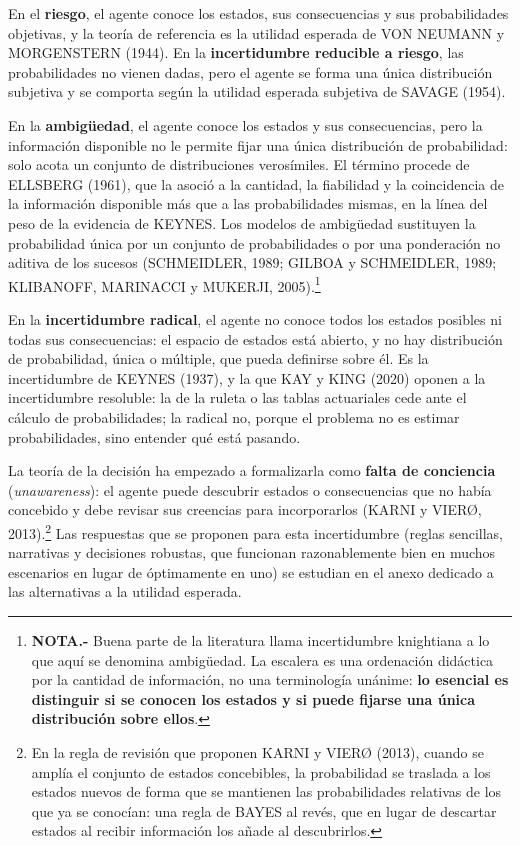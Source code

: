 \documentclass[10pt,a4paper]{article}
\newcounter{anexo}
\begin{document}
En el \textbf{riesgo}, el agente conoce los estados, sus consecuencias y sus probabilidades objetivas, y la teoría de referencia es la utilidad esperada de VON NEUMANN y MORGENSTERN (1944). En la \textbf{incertidumbre reducible a riesgo}, las probabilidades no vienen dadas, pero el agente se forma una única distribución subjetiva y se comporta según la utilidad esperada subjetiva de SAVAGE (1954).

En la \textbf{ambigüedad}, el agente conoce los estados y sus consecuencias, pero la información disponible no le permite fijar una única distribución de probabilidad: solo acota un conjunto de distribuciones verosímiles. El término procede de ELLSBERG (1961), que la asoció a la cantidad, la fiabilidad y la coincidencia de la información disponible más que a las probabilidades mismas, en la línea del peso de la evidencia de KEYNES. Los modelos de ambigüedad sustituyen la probabilidad única por un conjunto de probabilidades o por una ponderación no aditiva de los sucesos (SCHMEIDLER, 1989; GILBOA y SCHMEIDLER, 1989; KLIBANOFF, MARINACCI y MUKERJI, 2005).\footnote{%
    \textbf{NOTA.-} Buena parte de la literatura llama incertidumbre knightiana a lo que aquí se denomina ambigüedad. La escalera es una ordenación didáctica por la cantidad de información, no una terminología unánime: \textbf{lo esencial es distinguir si se conocen los estados y si puede fijarse una única distribución sobre ellos}.
}

En la \textbf{incertidumbre radical}, el agente no conoce todos los estados posibles ni todas sus consecuencias: el espacio de estados está abierto, y no hay distribución de probabilidad, única o múltiple, que pueda definirse sobre él. Es la incertidumbre de KEYNES (1937), y la que KAY y KING (2020) oponen a la incertidumbre resoluble: la de la ruleta o las tablas actuariales cede ante el cálculo de probabilidades; la radical no, porque el problema no es estimar probabilidades, sino entender qué está pasando. 

La teoría de la decisión ha empezado a formalizarla como \textbf{falta de conciencia} (\textit{unawareness}): el agente puede descubrir estados o consecuencias que no había concebido y debe revisar sus creencias para incorporarlos (KARNI y VIERØ, 2013).\footnote{%
    En la regla de revisión que proponen KARNI y VIERØ (2013), cuando se amplía el conjunto de estados concebibles, la probabilidad se traslada a los estados nuevos de forma que se mantienen las probabilidades relativas de los que ya se conocían: una regla de BAYES al revés, que en lugar de descartar estados al recibir información los añade al descubrirlos.
} Las respuestas que se proponen para esta incertidumbre (reglas sencillas, narrativas y decisiones robustas, que funcionan razonablemente bien en muchos escenarios en lugar de óptimamente en uno) se estudian en el anexo dedicado a las alternativas a la utilidad esperada.
\end{document}
